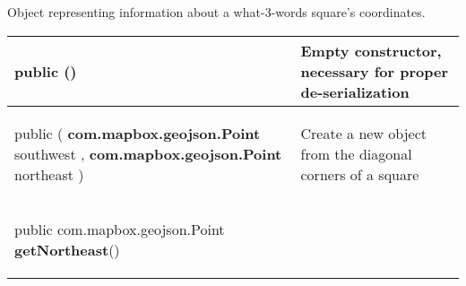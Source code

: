  {\scriptsize Object representing information about a what{-}3{-}words square's coordinates.
 
\vspace*{-5pt} 
\begin{tabularx}{\linewidth}{m{}|m{}}
\label{tab:W3WSquareData}
\begin{raggedleft}public  \textbf{\hyperref[tab:W3WSquareData]{\color{blue}{W3WSquareData}}}()
\end{raggedleft} &
 Empty constructor, necessary for proper de{-}serialization\\ \hline 
\begin{raggedleft}public  \textbf{\hyperref[tab:W3WSquareData]{\color{blue}{W3WSquareData}} }(\newline \hfill 
\hspace*{ 5pt} \textbf{com.mapbox.geojson.Point} southwest , \newline
 \hspace*{ 5pt} \textbf{com.mapbox.geojson.Point} northeast  )
\end{raggedleft} &
 Create a new \hyperref[tab:W3WSquareData]{\color{blue}{W3WSquareData}} object from the diagonal corners of a square\\ \hline 
\begin{raggedleft}public com.mapbox.geojson.Point \textbf{getNortheast}()
\end{raggedleft} &
 \\\end{tabularx}
}
